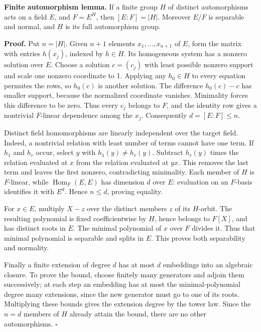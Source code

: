 \documentclass[11pt,a4paper]{article}
\begin{document}
\textbf{Finite automorphism lemma.} If a finite group \(H\) of distinct
automorphisms acts on a field \(E\), and \(F=E^H\), then \([E:F]=|H|\).
Moreover \(E/F\) is separable and normal, and \(H\) is its full
automorphism group.

\textbf{Proof.} Put \(n=|H|\). Given \(n+1\) elements
\(x_1,\ldots,x_{n+1}\) of \(E\), form the matrix with entries
\(h(x_j)\), indexed by \(h\in H\). Its homogeneous system has a nonzero
solution over \(E\). Choose a solution \(c=(c_j)\) with least possible
nonzero support and scale one nonzero coordinate to 1. Applying any
\(h_0\in H\) to every equation permutes the rows, so \(h_0(c)\) is
another solution. The difference \(h_0(c)-c\) has smaller support,
because the normalized coordinate vanishes. Minimality forces this
difference to be zero. Thus every \(c_j\) belongs to \(F\), and the
identity row gives a nontrivial \(F\)-linear dependence among the
\(x_j\). Consequently \(d=[E:F]\leq n\).

Distinct field homomorphisms are linearly independent over the target
field. Indeed, a nontrivial relation with least number of terms cannot
have one term. If \(h_1\) and \(h_r\) occur, select \(y\) with
\(h_1(y)\ne h_r(y)\). Subtract \(h_r(y)\) times the relation evaluated
at \(x\) from the relation evaluated at \(yx\). This removes the last
term and leaves the first nonzero, contradicting minimality. Each member
of \(H\) is \(F\)-linear, while \(\operatorname{Hom}_F(E,E)\) has
dimension \(d\) over \(E\): evaluation on an \(F\)-basis identifies it
with \(E^d\). Hence \(n\leq d\), proving equality.

For \(x\in E\), multiply \(X-z\) over the distinct members \(z\) of its
\(H\)-orbit. The resulting polynomial is fixed coefficientwise by \(H\),
hence belongs to \(F[X]\), and has distinct roots in \(E\). The minimal
polynomial of \(x\) over \(F\) divides it. Thus that minimal polynomial
is separable and splits in \(E\). This proves both separability and
normality.

Finally a finite extension of degree \(d\) has at most \(d\) embeddings
into an algebraic closure. To prove the bound, choose finitely many
generators and adjoin them successively; at each step an embedding has
at most the minimal-polynomial degree many extensions, since the new
generator must go to one of its roots. Multiplying these bounds gives
the extension degree by the tower law. Since the \(n=d\) members of
\(H\) already attain the bound, there are no other automorphisms.
\(\square\)
\end{document}

